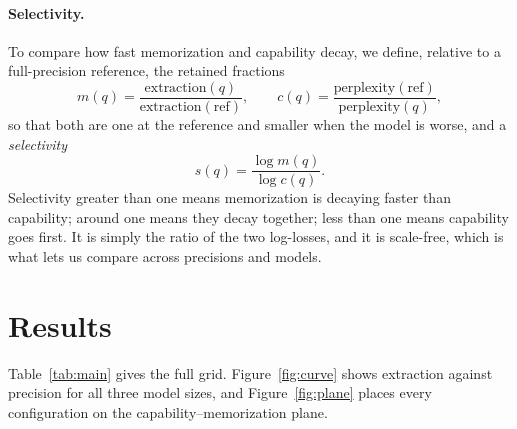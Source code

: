 \documentclass{article}
\begin{document}
\paragraph{Selectivity.}
To compare how fast memorization and capability decay, we define, relative to
a full-precision reference, the retained fractions
\[
  m(q) = \frac{\text{extraction}(q)}{\text{extraction}(\text{ref})},
  \qquad
  c(q) = \frac{\text{perplexity}(\text{ref})}{\text{perplexity}(q)},
\]
so that both are one at the reference and smaller when the model is worse,
and a \emph{selectivity}
\[
  s(q) = \frac{\log m(q)}{\log c(q)}.
\]
Selectivity greater than one means memorization is decaying faster than
capability; around one means they decay together; less than one means
capability goes first. It is simply the ratio of the two log-losses, and it
is scale-free, which is what lets us compare across precisions and models.

\section{Results}
\label{sec:results}

Table~\ref{tab:main} gives the full grid. Figure~\ref{fig:curve} shows
extraction against precision for all three model sizes, and
Figure~\ref{fig:plane} places every configuration on the
capability--memorization plane.
\end{document}
